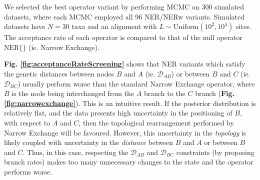 \documentclass[10pt,letterpaper]{article}
\begin{document}
We selected the best operator variant by performing MCMC on 300 simulated datasets, where each MCMC employed all 96 NER/NERw variants. Simulated datasets have $N=30$ taxa and an alignment with $L \sim \text{Uniform}(10^2, 10^4)$ sites. The acceptance rate of each operator is compared to that of the null operator $\text{NER}\{\}$ (ie. Narrow Exchange). 


\textbf{Fig. \ref{fig:acceptanceRateScreening}} shows that NER variants which satisfy the genetic distances between nodes $B$ and $A$ (ie. $\mathcal{D}_{AB}$) or between $B$ and $C$ (ie. $\mathcal{D}_{BC}$) usually perform worse than the standard Narrow Exchange operator, where $B$ is the node being interchanged from the $A$ branch to the $C$ branch (\textbf{Fig. \ref{fig:narrowexchange}}). This is an intuitive result. If the posterior distribution is relatively flat, and the data presents high uncertainty in the positioning of $B$, with respect to $A$ and $C$, then the topological rearrangement performed by Narrow Exchange will be favoured. However, this uncertainty in the \textit{topology} is likely coupled with uncertainty in the \textit{distance} between $B$ and $A$ or between $B$ and $C$. Thus, in this case, respecting the $\mathcal{D}_{AB}$ and $\mathcal{D}_{BC}$ constraints (by proposing branch rates) makes too many unnecessary changes to the state and the operator performs worse.
\end{document}
